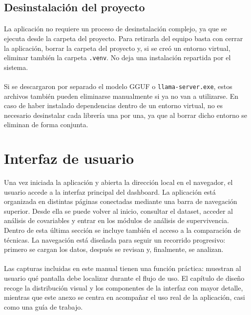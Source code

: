 \subsection{Desinstalación del proyecto}

\paragraph*{}La aplicación no requiere un proceso de desinstalación complejo, ya que se ejecuta desde la carpeta del proyecto. Para retirarla del equipo basta con cerrar la aplicación, borrar la carpeta del proyecto y, si se creó un entorno virtual, eliminar también la carpeta \texttt{.venv}. No deja una instalación repartida por el sistema.

\paragraph*{}Si se descargaron por separado el modelo GGUF o \texttt{llama-server.exe}, estos archivos también pueden eliminarse manualmente si ya no van a utilizarse. En caso de haber instalado dependencias dentro de un entorno virtual, no es necesario desinstalar cada librería una por una, ya que al borrar dicho entorno se eliminan de forma conjunta.

\section{Interfaz de usuario}

\paragraph*{}Una vez iniciada la aplicación y abierta la dirección local en el navegador, el usuario accede a la interfaz principal del dashboard. La aplicación está organizada en distintas páginas conectadas mediante una barra de navegación superior. Desde ella se puede volver al inicio, consultar el dataset, acceder al análisis de covariables y entrar en los módulos de análisis de supervivencia. Dentro de esta última sección se incluye también el acceso a la comparación de técnicas. La navegación está diseñada para seguir un recorrido progresivo: primero se cargan los datos, después se revisan y, finalmente, se analizan.

\paragraph*{}Las capturas incluidas en este manual tienen una función práctica: muestran al usuario qué pantalla debe localizar durante el flujo de uso. El capítulo de diseño recoge la distribución visual y los componentes de la interfaz con mayor detalle, mientras que este anexo se centra en acompañar el uso real de la aplicación, casi como una guía de trabajo.

